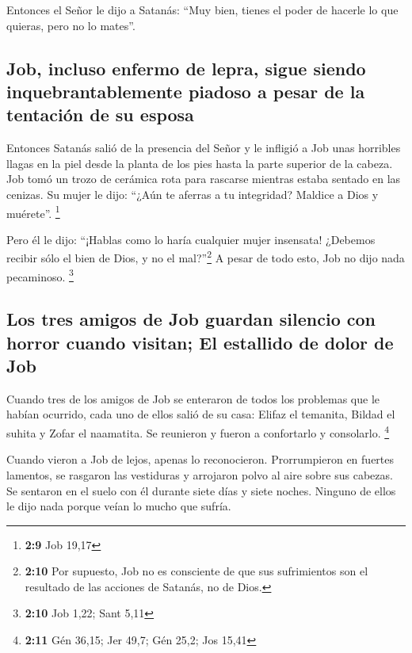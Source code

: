  Entonces el Señor le dijo a Satanás: ``Muy bien, tienes
el poder de hacerle lo que quieras, pero no lo mates''.

\hypertarget{job-incluso-enfermo-de-lepra-sigue-siendo-inquebrantablemente-piadoso-a-pesar-de-la-tentaciuxf3n-de-su-esposa}{%
\subsection{Job, incluso enfermo de lepra, sigue siendo
inquebrantablemente piadoso a pesar de la tentación de su
esposa}\label{job-incluso-enfermo-de-lepra-sigue-siendo-inquebrantablemente-piadoso-a-pesar-de-la-tentaciuxf3n-de-su-esposa}}

 Entonces Satanás salió de la presencia del Señor y le
infligió a Job unas horribles llagas en la piel desde la planta de los
pies hasta la parte superior de la cabeza.  Job tomó un
trozo de cerámica rota para rascarse mientras estaba sentado en las
cenizas.  Su mujer le dijo: ``¿Aún te aferras a tu
integridad? Maldice a Dios y muérete''. \footnote{\textbf{2:9} Job 19,17}

 Pero él le dijo: ``¡Hablas como lo haría cualquier mujer
insensata! ¿Debemos recibir sólo el bien de Dios, y no el
mal?''\footnote{\textbf{2:10} Por supuesto, Job no es consciente de que
  sus sufrimientos son el resultado de las acciones de Satanás, no de
  Dios.} A pesar de todo esto, Job no dijo nada pecaminoso. \footnote{\textbf{2:10}
  Job 1,22; Sant 5,11}

\hypertarget{los-tres-amigos-de-job-guardan-silencio-con-horror-cuando-visitan-el-estallido-de-dolor-de-job}{%
\subsection{Los tres amigos de Job guardan silencio con horror cuando
visitan; El estallido de dolor de
Job}\label{los-tres-amigos-de-job-guardan-silencio-con-horror-cuando-visitan-el-estallido-de-dolor-de-job}}

 Cuando tres de los amigos de Job se enteraron de todos
los problemas que le habían ocurrido, cada uno de ellos salió de su
casa: Elifaz el temanita, Bildad el suhita y Zofar el naamatita. Se
reunieron y fueron a confortarlo y consolarlo. \footnote{\textbf{2:11}
  Gén 36,15; Jer 49,7; Gén 25,2; Jos 15,41}

 Cuando vieron a Job de lejos, apenas lo reconocieron.
Prorrumpieron en fuertes lamentos, se rasgaron las vestiduras y
arrojaron polvo al aire sobre sus cabezas.  Se sentaron
en el suelo con él durante siete días y siete noches. Ninguno de ellos
le dijo nada porque veían lo mucho que sufría.

